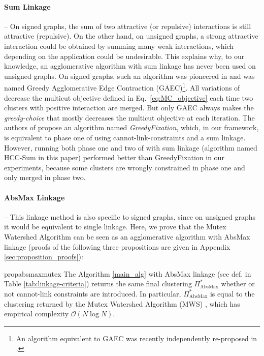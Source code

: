 \paragraph{Sum Linkage} -- 
On signed graphs, the sum of two attractive (or repulsive) interactions is still attractive (repulsive). On the other hand, on unsigned graphs, a strong attractive interaction could be obtained by summing many weak interactions, which depending on the application could be undesirable. This explains why, to our knowledge, an agglomerative algorithm with sum linkage has never been used on unsigned graphs. On signed graphs, such an algorithm was pioneered in \cite{levinkov2017comparative,keuper2015efficient} and was named Greedy Agglomerative Edge Contraction (GAEC)\footnote{An algorithm equivalent to GAEC was recently independently re-proposed in \cite{chehreghani2020hierarchical}.}. All variations of \algname{} decrease the multicut objective defined in Eq.~\ref{eq:MC_objective} each time two clusters with positive interaction are merged. But only GAEC always makes the \emph{greedy-choice} that mostly decreases the multicut objective at each iteration. The authors of \cite{levinkov2017comparative} propose an algorithm named \emph{GreedyFixation}, which, in our framework, is equivalent to phase one of \algname{} using cannot-link-constraints and a sum linkage. However, running both phase one and two of \algname{} with sum linkage (algorithm named HCC-Sum in this paper) performed better than GreedyFixation in our experiments, because some clusters are wrongly constrained in phase one and only merged in phase two. 

\paragraph{AbsMax Linkage} -- This linkage method is also specific to signed graphs, since on unsigned graphs it would be equivalent to single linkage. Here, we prove that the Mutex Watershed Algorithm \cite{wolf2018mutex} can be seen as an agglomerative algorithm with AbsMax linkage (proofs of the following three propositions are given in Appendix \ref{sec:proposition_proofs}):
\begin{restatable}{prop}{absmaxmutex}
\label{prop:absmax_mutex}
The \algname{} Algorithm \ref{main_alg} with AbsMax linkage (see def. in Table \ref{tab:linkage-criteria}) returns the same final clustering $\Pi^*_{\mathrm{AbsMax}}$ whether or not cannot-link constraints are introduced. In particular, $\Pi^*_{\mathrm{AbsMax}}$ is equal to the clustering returned by the Mutex Watershed Algorithm (MWS) \cite{wolf2018mutex}, which has empirical complexity $\mathcal{O}(N \log N)$. 
\end{restatable}


